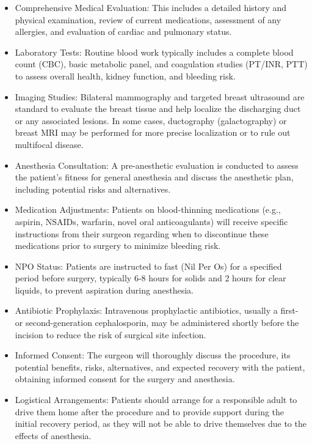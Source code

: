 \begin{itemize}
  \item Comprehensive Medical Evaluation: This includes a detailed history and physical examination, review of current medications, assessment of any allergies, and evaluation of cardiac and pulmonary status.
  \item Laboratory Tests: Routine blood work typically includes a complete blood count (CBC), basic metabolic panel, and coagulation studies (PT/INR, PTT) to assess overall health, kidney function, and bleeding risk.
  \item Imaging Studies: Bilateral mammography and targeted breast ultrasound are standard to evaluate the breast tissue and help localize the discharging duct or any associated lesions. In some cases, ductography (galactography) or breast MRI may be performed for more precise localization or to rule out multifocal disease.
  \item Anesthesia Consultation: A pre-anesthetic evaluation is conducted to assess the patient's fitness for general anesthesia and discuss the anesthetic plan, including potential risks and alternatives.
  \item Medication Adjustments: Patients on blood-thinning medications (e.g., aspirin, NSAIDs, warfarin, novel oral anticoagulants) will receive specific instructions from their surgeon regarding when to discontinue these medications prior to surgery to minimize bleeding risk.
  \item NPO Status: Patients are instructed to fast (Nil Per Os) for a specified period before surgery, typically 6-8 hours for solids and 2 hours for clear liquids, to prevent aspiration during anesthesia.
  \item Antibiotic Prophylaxis: Intravenous prophylactic antibiotics, usually a first- or second-generation cephalosporin, may be administered shortly before the incision to reduce the risk of surgical site infection.
  \item Informed Consent: The surgeon will thoroughly discuss the procedure, its potential benefits, risks, alternatives, and expected recovery with the patient, obtaining informed consent for the surgery and anesthesia.
  \item Logistical Arrangements: Patients should arrange for a responsible adult to drive them home after the procedure and to provide support during the initial recovery period, as they will not be able to drive themselves due to the effects of anesthesia.
\end{itemize}

